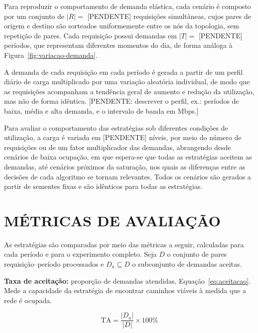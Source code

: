 Para reproduzir o comportamento de demanda elástica, cada cenário é composto por um conjunto de $|R| = $ [PENDENTE] requisições simultâneas, cujos pares de origem e destino são sorteados uniformemente entre os nós da topologia, sem repetição de pares. Cada requisição possui demandas em $|T| = $ [PENDENTE] períodos, que representam diferentes momentos do dia, de forma análoga à Figura~\ref{fig:variacao-demanda}. %

A demanda de cada requisição em cada período é gerada a partir de um perfil diário de carga multiplicado por uma variação aleatória individual, de modo que as requisições acompanham a tendência geral de aumento e redução da utilização, mas não de forma idêntica. [PENDENTE: descrever o perfil, ex.: períodos de baixa, média e alta demanda, e o intervalo de banda em Mbps.]

Para avaliar o comportamento das estratégias sob diferentes condições de utilização, a carga é variada em [PENDENTE] níveis, por meio do número de requisições ou de um fator multiplicador das demandas, abrangendo desde cenários de baixa ocupação, em que espera-se que todas as estratégias aceitem as demandas, até cenários próximos da saturação, nos quais as diferenças entre as decisões de cada algoritmo se tornam relevantes. Todos os cenários são gerados a partir de sementes fixas e são idênticos para todas as estratégias.

\section{MÉTRICAS DE AVALIAÇÃO}
\label{sec:metricas}

As estratégias são comparadas por meio das métricas a seguir, calculadas para cada período e para o experimento completo. Seja $D$ o conjunto de pares requisição--período processados e $D_a \subseteq D$ o subconjunto de demandas aceitas.

\textbf{Taxa de aceitação:} proporção de demandas atendidas, Equação~\ref{eq:aceitacao}. Mede a capacidade da estratégia de encontrar caminhos viáveis à medida que a rede é ocupada.

\begin{equation}
    \text{TA} = \frac{|D_a|}{|D|} \times 100\%
    \label{eq:aceitacao}
\end{equation}

